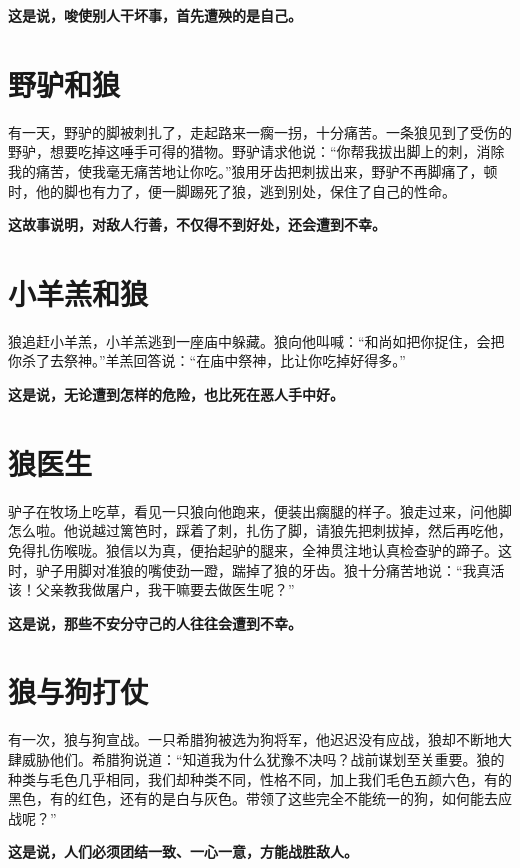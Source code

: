 {\bfseries \color{red}这是说，唆使别人干坏事，首先遭殃的是自己。}

\section{野驴和狼}

有一天，野驴的脚被刺扎了，走起路来一瘸一拐，十分痛苦。一条狼见到了受伤的野驴，想要吃掉这唾手可得的猎物。野驴请求他说：“你帮我拔出脚上的刺，消除我的痛苦，使我毫无痛苦地让你吃。”狼用牙齿把刺拔出来，野驴不再脚痛了，顿时，他的脚也有力了，便一脚踢死了狼，逃到别处，保住了自己的性命。

{\bfseries \color{red}这故事说明，对敌人行善，不仅得不到好处，还会遭到不幸。}

\section{小羊羔和狼}

狼追赶小羊羔，小羊羔逃到一座庙中躲藏。狼向他叫喊：“和尚如把你捉住，会把你杀了去祭神。”羊羔回答说：“在庙中祭神，比让你吃掉好得多。”

{\bfseries \color{red}这是说，无论遭到怎样的危险，也比死在恶人手中好。}

\section{狼医生}

驴子在牧场上吃草，看见一只狼向他跑来，便装出瘸腿的样子。狼走过来，问他脚怎么啦。他说越过篱笆时，踩着了刺，扎伤了脚，请狼先把刺拔掉，然后再吃他，免得扎伤喉咙。狼信以为真，便抬起驴的腿来，全神贯注地认真检查驴的蹄子。这时，驴子用脚对准狼的嘴使劲一蹬，踹掉了狼的牙齿。狼十分痛苦地说：“我真活该！父亲教我做屠户，我干嘛要去做医生呢？”

{\bfseries \color{red}这是说，那些不安分守己的人往往会遭到不幸。}

\section{狼与狗打仗}

有一次，狼与狗宣战。一只希腊狗被选为狗将军，他迟迟没有应战，狼却不断地大肆威胁他们。希腊狗说道：“知道我为什么犹豫不决吗？战前谋划至关重要。狼的种类与毛色几乎相同，我们却种类不同，性格不同，加上我们毛色五颜六色，有的黑色，有的红色，还有的是白与灰色。带领了这些完全不能统一的狗，如何能去应战呢？”

{\bfseries \color{red}这是说，人们必须团结一致、一心一意，方能战胜敌人。}

